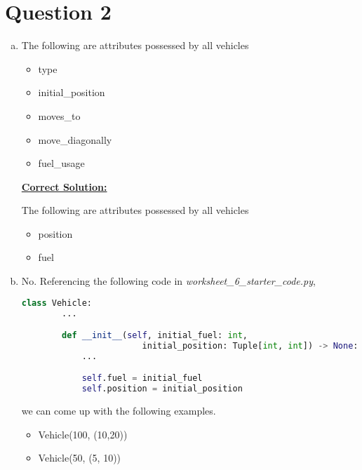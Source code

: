 \documentclass[12pt]{article}
\begin{document}
\section*{Question 2}
\begin{enumerate}[a.]
    \item The following are attributes possessed by all vehicles

    \begin{itemize}
        \item type
        \item initial\_position
        \item moves\_to
        \item move\_diagonally
        \item fuel\_usage
    \end{itemize}

    \begin{mdframed}
        \underline{\textbf{Correct Solution:}}

        \bigskip

        The following are attributes possessed by all vehicles

        \begin{itemize}
            \item \color{red}position\color{black}
            \item \color{red}fuel\color{black}
        \end{itemize}

    \end{mdframed}


    \item No. Referencing the following code in \textit{worksheet\_6\_starter\_code.py},

    \begin{lstlisting}[language=Python]
    class Vehicle:
        ...

        def __init__(self, initial_fuel: int,
                        initial_position: Tuple[int, int]) -> None:
            ...

            self.fuel = initial_fuel
            self.position = initial_position
    \end{lstlisting}

    \bigskip

    we can come up with the following examples.

    \begin{itemize}
        \item Vehicle(100, (10,20))
        \item Vehicle(50, (5, 10))
    \end{itemize}


\end{enumerate}
\end{document}
